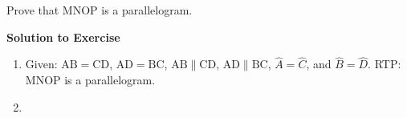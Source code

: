 {\begin{mdframed}[linewidth=4, leftmargin=40, rightmargin=40]
\begin{exercise}
Prove that MNOP is a parallelogram.\par 
\vspace{5pt}
\label{m39352*solfhsst!!!underscore!!!id023}\noindent\textbf{Solution to Exercise }\label{m39352*id085424}\begin{enumerate}[noitemsep, label=\textbf{Step} \textbf{\arabic*}. ] 
            \leftskip=20pt\rightskip=\leftskip\item Given: \begin{math}\mathrm{AB}=\mathrm{CD}\end{math}, \begin{math}\mathrm{AD}=\mathrm{BC}\end{math}, \begin{math}\mathrm{AB}\parallel \mathrm{CD}\end{math}, \begin{math}\mathrm{AD}\parallel \mathrm{BC}\end{math},  \begin{math}\hat{A}=\hat{C}\end{math}, and \begin{math}\hat{B}=\hat{D}\end{math}. RTP: MNOP is a parallelogram.\item 
\label{m39352*id368}\nopagebreak\noindent{}
    \ifthenelse{\lengthtest{\mymathboxwidth < \columnwidth}}{%
}
\end{enumerate}
\end{exercise}
\end{mdframed}}

